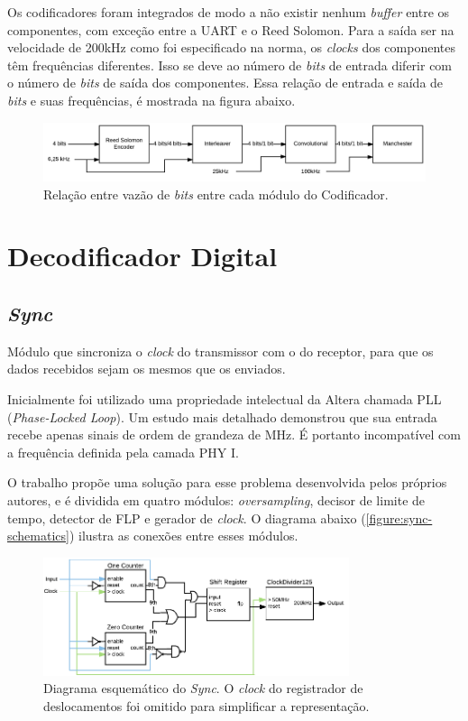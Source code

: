 	Os codificadores foram integrados de modo a não existir nenhum \textit{buffer} entre os componentes, com exceção entre a UART e o Reed Solomon. Para a saída ser na velocidade de 200kHz como foi especificado na norma, os \textit{clocks} dos componentes têm frequências diferentes. Isso se deve ao número de \textit{bits} de entrada diferir com o número de \textit{bits} de saída dos componentes. Essa relação de entrada e saída de \textit{bits} e suas frequências, é mostrada na figura abaixo.
	\begin{figure}[h]
		\caption{\label{figure:integration-encoder}Relação entre vazão de \textit{bits} entre cada módulo do Codificador.}
		\centering
		\includegraphics[width=1\textwidth]{integration/speeds-encoder.pdf}
	\end{figure}

	\section{Decodificador Digital}
	
	\subsection{\textit{Sync}}
	
	Módulo que sincroniza o \textit{clock} do transmissor com o do receptor, para que os dados recebidos sejam os mesmos que os enviados. 
	
	Inicialmente foi utilizado uma propriedade intelectual da Altera chamada PLL (\textit{Phase-Locked Loop}). Um estudo mais detalhado demonstrou que sua entrada recebe apenas sinais de ordem de grandeza de MHz. É portanto incompatível com a frequência definida pela camada PHY I.
	
	O trabalho propõe uma solução para esse problema desenvolvida pelos próprios autores, e é dividida em quatro módulos: \textit{oversampling}, decisor de limite de tempo, detector de FLP e gerador de \textit{clock}. O diagrama abaixo (\autoref{figure:sync-schematics}) ilustra as conexões entre esses módulos.
	\begin{figure}[h]
		\caption{\label{figure:sync-schematics}Diagrama esquemático do \textit{Sync}. O \textit{clock} do registrador de deslocamentos foi omitido para simplificar a representação.}
		\centering
		\includegraphics[width=0.8\textwidth]{sync/schematics.pdf}
	\end{figure}
	
